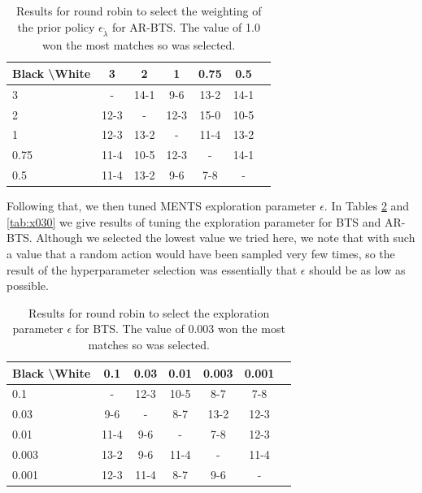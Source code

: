     \begin{table}[]
    \centering
        \begin{tabular}{l|cccccc}
            \textbf{Black \textbackslash White}     & 3  & 2   & 1   & 0.75    & 0.5    \\ 
            \hline
                                    3            & - & 14-1 & 9-6 & 13-2 & 14-1   		\\
                                    2            & 12-3 & - & 12-3 & 15-0 & 10-5   		\\
                                    1          & 12-3 & 13-2 & - & 11-4 & 13-2   		\\
                                    0.75          & 11-4 & 10-5 & 12-3 & - & 14-1   		\\
                                    0.5         & 11-4 & 13-2 & 9-6 & 7-8 &   -   	\\   
        \end{tabular}
        \caption{Results for round robin to select the weighting of the prior policy $\epsilon_{\tilde{\lambda}}$ for AR-BTS. The value of 1.0 won the most matches so was selected. \label{tab:x020}}
    \end{table}
    
    
    
    
    
    
    Following that, we then tuned MENTS exploration parameter $\epsilon$. In Tables \ref{tab:w030} and \ref{tab:x030} we give results of tuning the exploration parameter for BTS and AR-BTS. Although we selected the lowest value we tried here, we note that with such a value that a random action would have been sampled very few times, so the result of the hyperparameter selection was essentially that $\epsilon$ should be as low as possible.
    
    \begin{table}[]
    \centering
        \begin{tabular}{l|cccccc}
            \textbf{Black \textbackslash White}     & 0.1  & 0.03   & 0.01   & 0.003    & 0.001    \\ 
            \hline
                                    0.1            & - & 12-3 & 10-5 & 8-7 & 7-8   		\\
                                    0.03            & 9-6 & - & 8-7 & 13-2 & 12-3   		\\
                                    0.01          & 11-4 & 9-6 & - & 7-8 & 12-3   		\\
                                    0.003          & 13-2 & 9-6 & 11-4 & - & 11-4   		\\
                                    0.001         & 12-3 & 11-4 & 8-7 & 9-6 &   -   	\\    
        \end{tabular}
        \caption{Results for round robin to select the exploration parameter $\epsilon$ for BTS. The value of 0.003 won the most matches so was selected. \label{tab:w030}}
    \end{table}
    
